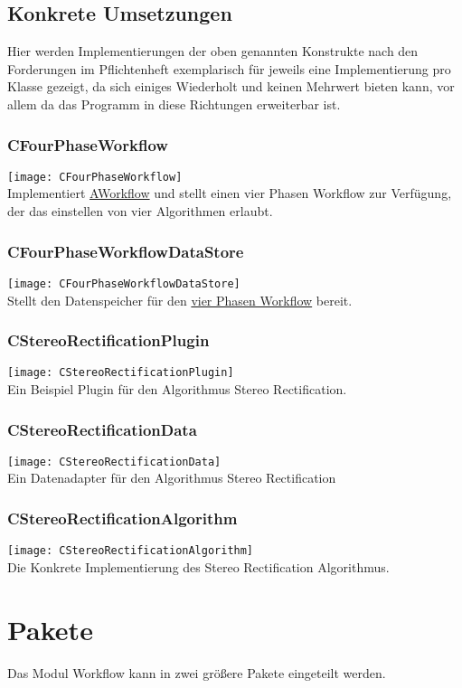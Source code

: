 \subsection{Konkrete Umsetzungen}
Hier werden Implementierungen der oben genannten Konstrukte nach den Forderungen im Pflichtenheft exemplarisch für jeweils eine Implementierung pro Klasse gezeigt, da sich einiges Wiederholt und keinen Mehrwert bieten kann, vor allem da das Programm in diese Richtungen erweiterbar ist.
\subsubsection{CFourPhaseWorkflow} \label{Workflow:CFourPhaseWorkflow}
\texttt{[image: CFourPhaseWorkflow]}\\
Implementiert \hyperref[Workflow:AWorkflow]{AWorkflow} und stellt einen vier Phasen Workflow zur Verfügung, der das einstellen von vier Algorithmen erlaubt.
\subsubsection{CFourPhaseWorkflowDataStore}
\texttt{[image: CFourPhaseWorkflowDataStore]}\\
Stellt den Datenspeicher für den \hyperref[Workflow:CFourPhaseWorkflow]{vier Phasen Workflow} bereit.
\subsubsection{CStereoRectificationPlugin}
\texttt{[image: CStereoRectificationPlugin]}\\
Ein Beispiel Plugin für den Algorithmus Stereo Rectification.
\subsubsection{CStereoRectificationData}
\texttt{[image: CStereoRectificationData]}\\
Ein Datenadapter für den Algorithmus Stereo Rectification
\subsubsection{CStereoRectificationAlgorithm}
\texttt{[image: CStereoRectificationAlgorithm]}\\
Die Konkrete Implementierung des Stereo Rectification Algorithmus.

\section{Pakete}
Das Modul Workflow kann in zwei größere Pakete eingeteilt werden.
